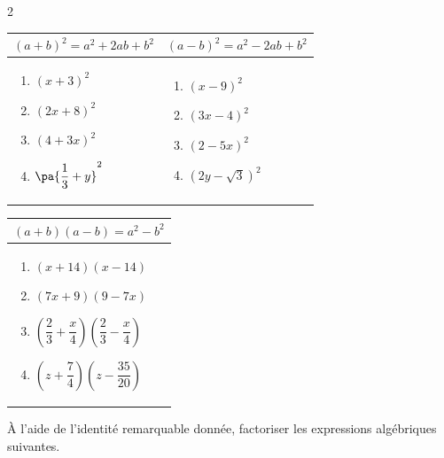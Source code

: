 {\begin{multicols}{2}
\begin{exo}
		  \def\arraystretch{1.5}
		  \begin{tabular}{m{3.5cm}|m{3.5cm}}
			  $(a + b)^2 = a^2 + 2ab + b^2$ & $(a - b)^2 = a^2 - 2ab + b^2$ \\ \hline
			  \begin{enumerate}[label=\alph*)]
				  \item $(x + 3)^2$
				  \item $(2x + 8)^2$
				  \item $(4 + 3x)^2$
				  \item $\pa{\dfrac{1}{3} + y}^2$
			  \end{enumerate}
			                                &
			  \begin{enumerate}[label=\alph*)]
				  \item $(x - 9)^2$
				  \item $(3x - 4)^2$
				  \item $(2 - 5x)^2$
				  \item $(2y - \sqrt{3})^2$
			  \end{enumerate}
		  \end{tabular}
		  \begin{center}
			  \begin{tabular}{m{3.8cm}}
				  $(a + b)(a - b) = a^2 - b^2$ \\ \hline
				  \begin{enumerate}[label=\alph*)]
					  \item $(x + 14)(x - 14)$
					  \item $(7x + 9)(9 - 7x)$
					  \item $\left( \dfrac{2}{3} + \dfrac{x}{4} \right)\left( \dfrac{2}{3} - \dfrac{x}{4} \right)$
					  \item $\left( z + \dfrac{7}{4} \right)\left( z - \dfrac{35}{20} \right)$
				  \end{enumerate}
			  \end{tabular}
		  \end{center}
	  \end{exo}

	  \begin{exo}
		  À l'aide de l'identité remarquable donnée, factoriser les expressions algébriques suivantes.


\end{exo}
\end{multicols}}
